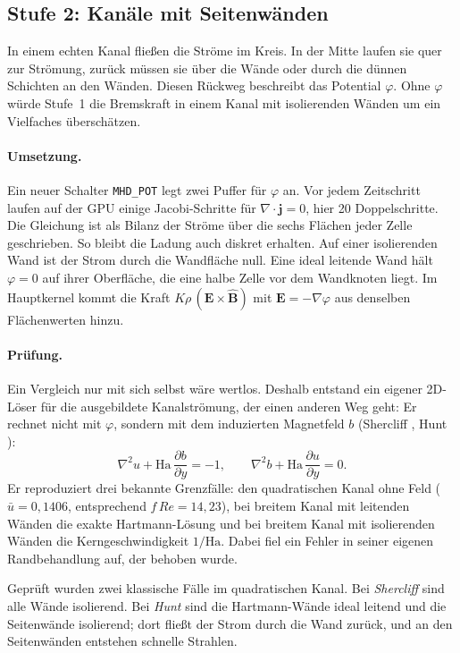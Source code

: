\subsection*{Stufe 2: Kanäle mit Seitenwänden}
In einem echten Kanal fließen die Ströme im Kreis. In der Mitte laufen sie quer zur Strömung, zurück müssen sie über
die Wände oder durch die dünnen Schichten an den Wänden. Diesen Rückweg beschreibt das Potential $\varphi$. Ohne
$\varphi$ würde Stufe~1 die Bremskraft in einem Kanal mit isolierenden Wänden um ein Vielfaches überschätzen.

\paragraph{Umsetzung.} Ein neuer Schalter \texttt{MHD\_POT} legt zwei Puffer für $\varphi$ an. Vor jedem
Zeitschritt laufen auf der GPU einige Jacobi-Schritte für $\nabla\cdot\mathbf{j} = 0$, hier 20 Doppelschritte. Die
Gleichung ist als Bilanz der Ströme über die sechs Flächen jeder Zelle geschrieben. So bleibt die Ladung auch
diskret erhalten. Auf einer isolierenden Wand ist der Strom durch die Wandfläche null. Eine ideal leitende Wand hält
$\varphi = 0$ auf ihrer Oberfläche, die eine halbe Zelle vor dem Wandknoten liegt. Im Hauptkernel kommt die Kraft
$K\rho\,(\mathbf{E}\times\hat{\mathbf{B}})$ mit $\mathbf{E} = -\nabla\varphi$ aus denselben Flächenwerten hinzu.

\paragraph{Prüfung.} Ein Vergleich nur mit sich selbst wäre wertlos. Deshalb entstand ein eigener 2D-Löser für die
ausgebildete Kanalströmung, der einen anderen Weg geht: Er rechnet nicht mit $\varphi$, sondern mit dem induzierten
Magnetfeld $b$ (Shercliff \cite{shercliff1953}, Hunt \cite{hunt1965}):
\[
\nabla^2 u + \mathrm{Ha}\,\frac{\partial b}{\partial y} = -1,\qquad \nabla^2 b + \mathrm{Ha}\,\frac{\partial u}{\partial y} = 0 .
\]
Er reproduziert drei bekannte Grenzfälle: den quadratischen Kanal ohne Feld ($\bar u = 0{,}1406$, entsprechend
$f\,\mathit{Re} = 14{,}23$), bei breitem Kanal mit leitenden Wänden die exakte Hartmann-Lösung und bei breitem Kanal mit
isolierenden Wänden die Kerngeschwindigkeit $1/\mathrm{Ha}$. Dabei fiel ein Fehler in seiner eigenen Randbehandlung
auf, der behoben wurde.

Geprüft wurden zwei klassische Fälle im quadratischen Kanal. Bei \emph{Shercliff} sind alle Wände isolierend. Bei
\emph{Hunt} sind die Hartmann-Wände ideal leitend und die Seitenwände isolierend; dort fließt der Strom durch die
Wand zurück, und an den Seitenwänden entstehen schnelle Strahlen.

